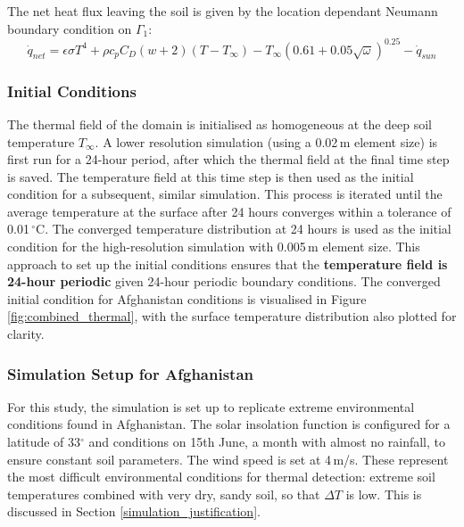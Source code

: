         \noindent The net heat flux leaving the soil is given by the location dependant Neumann boundary condition on $\Gamma_1$:
        \begin{equation}
        \dot{q}_{net} = \epsilon \sigma T^4+ \rho c_p C_D(w+2)(T - T_{\infty}) - T_{\infty} \left( 0.61 + 0.05 \sqrt{\omega} \right)^{0.25}  - \dot{q}_{sun}
        \end{equation}
        
    \subsubsection{Initial Conditions}

        \noindent The thermal field of the domain is initialised as homogeneous at the deep soil temperature $T_{\infty}$. A lower resolution simulation (using a 0.02\,m element size) is first run for a 24-hour period, after which the thermal field at the final time step is saved. The temperature field at this time step is then used as the initial condition for a subsequent, similar simulation. This process is iterated until the average temperature at the surface after 24 hours converges within a tolerance of 0.01\,$^{\circ}$C. The converged temperature distribution at 24 hours is used as the initial condition for the high-resolution simulation with 0.005\,m element size. This approach to set up the initial conditions ensures that the \textbf{temperature field is 24-hour periodic} given 24-hour periodic boundary conditions. The converged initial condition for Afghanistan conditions is visualised in Figure \ref{fig:combined_thermal}, with the surface temperature distribution also plotted for clarity.

    \subsubsection{Simulation Setup for Afghanistan} \label{thermal_setup}
    
        For this study, the simulation is set up to replicate extreme environmental conditions found in Afghanistan. The solar insolation function is configured for a latitude of 33\(^\circ\) and conditions on 15th June, a month with almost no rainfall, to ensure constant soil parameters. The wind speed is set at 4\,m/s. These represent the most difficult environmental conditions for thermal detection: extreme soil temperatures combined with very dry, sandy soil, so that \(\Delta T\) is low. This is discussed in Section \ref{simulation_justification}.
    
